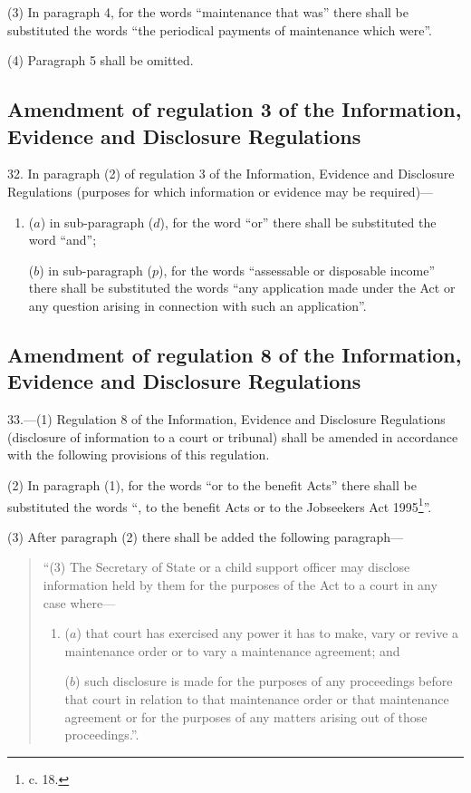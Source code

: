 \documentclass[12pt,a4paper]{article}
\begin{document}
(3) In paragraph 4, for the words “maintenance that was” there shall be substituted the words “the periodical payments of maintenance which were”.

(4) Paragraph 5 shall be omitted.

\subsection[32. Amendment of regulation 3 of the Information, Evidence and Disclosure Regulations]{Amendment of regulation 3 of the Information, Evidence and Disclosure Regulations}

32.  In paragraph (2) of regulation 3 of the Information, Evidence and Disclosure Regulations (purposes for which information or evidence may be required)—
\begin{enumerate}\item[]
($a$) in sub-paragraph ($d$), for the word “or” there shall be substituted the word “and”;

($b$) in sub-paragraph ($p$), for the words “assessable or disposable income” there shall be substituted the words “any application made under the Act or any question arising in connection with such an application”.
\end{enumerate}

\subsection[33. Amendment of regulation 8 of the Information, Evidence and Disclosure Regulations]{Amendment of regulation 8 of the Information, Evidence and Disclosure Regulations}

33.—(1) Regulation 8 of the Information, Evidence and Disclosure Regulations (disclosure of information to a court or tribunal) shall be amended in accordance with the following provisions of this regulation.

(2) In paragraph (1), for the words “or to the benefit Acts” there shall be substituted the words “, to the benefit Acts or to the Jobseekers Act 1995\footnote{ c. 18.}”.

(3) After paragraph (2) there shall be added the following paragraph—
\begin{quotation}
“(3) The Secretary of State or a child support officer may disclose information held by them for the purposes of the Act to a court in any case where—
\begin{enumerate}\item[]
($a$) that court has exercised any power it has to make, vary or revive a maintenance order or to vary a maintenance agreement; and

($b$) such disclosure is made for the purposes of any proceedings before that court in relation to that maintenance order or that maintenance agreement or for the purposes of any matters arising out of those proceedings.”.
\end{enumerate}
\end{quotation}
\end{document}
